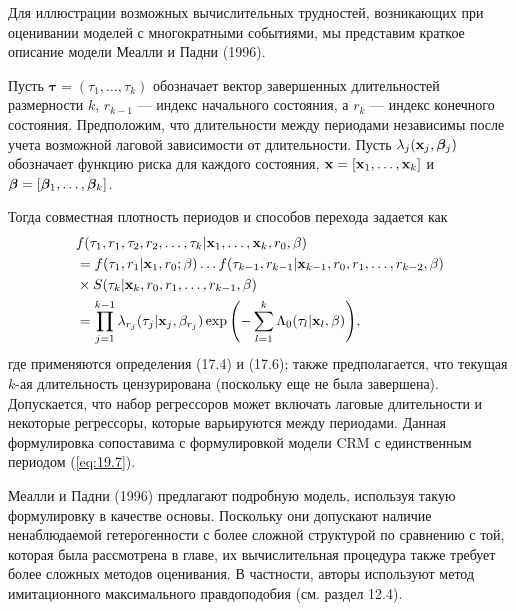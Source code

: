 \noindent
Для иллюстрации возможных вычислительных трудностей, возникающих при оценивании моделей с многократными событиями, мы представим краткое описание модели Меалли и Падни (1996).

Пусть $\bm{\tau} = (\tau_1, \ldots , \tau_k)$ обозначает вектор завершенных длительностей размерности $k$, $r_{k-1}$ --- индекс начального состояния, а $r_k$ --- индекс конечного состояния. Предположим, что длительности между периодами независимы после учета возможной лаговой зависимости от длительности. Пусть $\lambda_j(\mathbf{x}_j, \bm{\beta}_j)$ обозначает функцию риска для каждого состояния, $\mathbf{x} = [\mathbf{x}_1, \ldots , \mathbf{x}_k]$ и $\bm{\beta} = [\bm{\beta}_1, \ldots , \bm{\beta}_k]$.

Тогда совместная плотность периодов и способов перехода задается как
        \begin{align}\label{eq:19.26}
        &f(\tau_1, r_1, \tau_2, r_2,\ldots , \tau_k|\mathbf{x}_1,\ldots , \mathbf{x}_k,r_0,\beta) \\
        &= f(\tau_1, r_1|\mathbf{x}_1,r_0;\beta)\ldots f(\tau_{k-1},r_{k-1}|\mathbf{x}_{k-1}, r_0, r_1,\ldots , r_{k-2},\beta) \notag \\
        &\times S(\tau_k|\mathbf{x}_k,r_0,r_1,\ldots , r_{k-1}, \beta) \notag \\
        &= \prod^{k-1}_{j=1} \lambda_{r_j}(\tau_j|\mathbf{x}_j,\beta_{r_j}) \exp{\left(-\sum^{k}_{l=1} \Lambda_0(\tau_l|\mathbf{x}_l,\beta) \right)}, \notag
        \end{align}
где применяются определения (17.4) %
и (17.6); %
также предполагается, что текущая $k$-ая длительность цензурирована (поскольку еще не была завершена).
Допускается, что набор регрессоров может включать лаговые длительности и некоторые регрессоры, которые варьируются между периодами. Данная формулировка сопоставима с формулировкой модели CRM с единственным периодом (\ref{eq:19.7}).

Меалли и Падни (1996) предлагают подробную модель, используя такую формулировку в качестве основы. Поскольку они допускают наличие ненаблюдаемой гетерогенности с более сложной структурой по сравнению с той, которая была рассмотрена в главе, их вычислительная процедура также требует более сложных методов оценивания. В частности, авторы используют метод имитационного максимального правдоподобия (см. раздел 12.4). %





